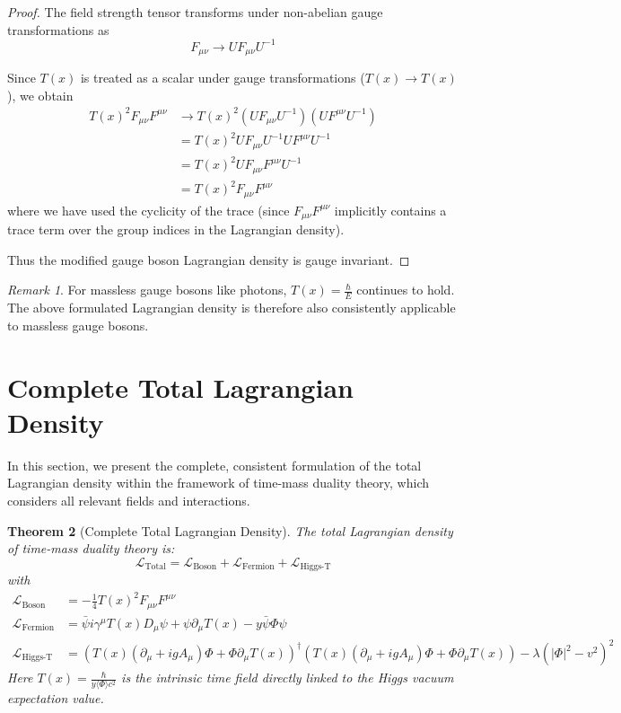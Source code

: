 \documentclass{article}
\newtheorem{theorem}{Theorem}[section]
\theoremstyle{definition}
\theoremstyle{remark}
\newtheorem{remark}[theorem]{Remark}
\newcommand{\Tfield}{T(x)} %
\newcommand{\DcovT}[1]{\Tfield D_\mu #1 + #1 \partial_\mu \Tfield}
\newcommand{\DhiggsTdef}{\Tfield (\partial_\mu + igA_\mu)\Phi + \Phi \partial_\mu \Tfield}
\begin{document}
	\begin{proof}
		The field strength tensor transforms under non-abelian gauge transformations as
		\begin{equation}
			F_{\mu\nu} \rightarrow U F_{\mu\nu} U^{-1}
		\end{equation}
		
		Since $\Tfield$ is treated as a scalar under gauge transformations ($\Tfield \rightarrow \Tfield$), we obtain
		\begin{align}
			\Tfield^2 F_{\mu\nu}F^{\mu\nu} &\rightarrow \Tfield^2 (U F_{\mu\nu} U^{-1})(U F^{\mu\nu} U^{-1}) \\
			&= \Tfield^2 U F_{\mu\nu} U^{-1} U F^{\mu\nu} U^{-1} \\
			&= \Tfield^2 U F_{\mu\nu} F^{\mu\nu} U^{-1} \\
			&= \Tfield^2 F_{\mu\nu}F^{\mu\nu}
		\end{align}
		where we have used the cyclicity of the trace (since $F_{\mu\nu}F^{\mu\nu}$ implicitly contains a trace term over the group indices in the Lagrangian density).
		
		Thus the modified gauge boson Lagrangian density is gauge invariant.
	\end{proof}
	
	\begin{remark}
		For massless gauge bosons like photons, $\Tfield = \frac{\hbar}{E}$ continues to hold. The above formulated Lagrangian density is therefore also consistently applicable to massless gauge bosons.
	\end{remark}
	
	\section{Complete Total Lagrangian Density}
	
	In this section, we present the complete, consistent formulation of the total Lagrangian density within the framework of time-mass duality theory, which considers all relevant fields and interactions.
	
	\begin{theorem}[Complete Total Lagrangian Density]
		The total Lagrangian density of time-mass duality theory is:
		\begin{equation}
			\mathcal{L}_{\text{Total}} = \mathcal{L}_{\text{Boson}} + \mathcal{L}_{\text{Fermion}} + \mathcal{L}_{\text{Higgs-T}}
		\end{equation}
		with
		\begin{align}
			\mathcal{L}_{\text{Boson}} &= -\frac{1}{4} \Tfield^2 F_{\mu\nu}F^{\mu\nu} \\
			\mathcal{L}_{\text{Fermion}} &= \bar{\psi}i\gamma^\mu \DcovT{\psi} - y\bar{\psi}\Phi\psi \\
			\mathcal{L}_{\text{Higgs-T}} &= (\DhiggsTdef)^\dagger (\DhiggsTdef) - \lambda(|\Phi|^2 - v^2)^2
		\end{align}
		Here $\Tfield = \frac{\hbar}{y\langle\Phi\rangle c^2}$ is the intrinsic time field directly linked to the Higgs vacuum expectation value.
	\end{theorem}
	
\end{document}
